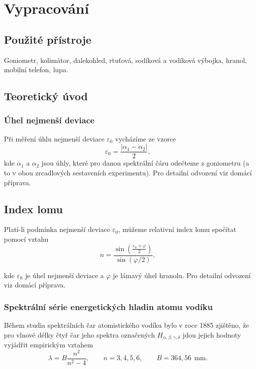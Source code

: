 \documentclass[english]{article}
\newcommand{\unit}[1]{\ \mathrm{#1}}
\begin{document}
	
\section{Vypracování}

	\subsection{Použité přístroje}
		Goniometr, kolimátor, dalekohled, rtuťová, sodíková a vodíková výbojka, hranol, mobilní telefon, lupa.
	
	\subsection{Teoretický úvod}
		
		\subsubsection{Úhel nejmenší deviace}
			Při měření úhlu nejmenší deviace $\varepsilon_0$ vycházíme ze vzorce 		
			\begin{equation}
			\varepsilon_0=\frac{|\alpha_1-\alpha_2|}{2},
			\label{eq:deviace}
			\end{equation}
			kde $\alpha_1$ a $\alpha_2$ jsou úhly, které pro danou spektrální čáru odečteme z goniometru (a to v obou zrcadlových sestaveních experimentu). Pro detailní odvození viz domácí příprava.
			
		\subsection{Index lomu}
			Platí-li podmínka nejmenší deviace $\varepsilon_0$, můžeme relativní index lomu spočítat pomocí vztahu
			\begin{equation}
			n=\frac{\sin\left(\frac{\varepsilon_0+\varphi}{2}\right)}{\sin\left(\varphi / 2\right)},
			\label{eq:index_lomu}
			\end{equation}
			
			kde $\varepsilon_0$ je úhel nejmenší deviace a $\varphi$ je lámavý úhel hranolu. Pro detailní odvození viz domácí příprava.
			
		\subsubsection{Spektrální série energetických hladin atomu vodíku}
			Během studia spektrálních čar atomistického vodíku bylo v roce 1885 zjištěno, že pro vlnové délky čtyř čar jeho spektra označených $H_{\alpha, \beta, \gamma, \delta}$ jdou jejich hodnoty vyjádřit empirickým vztahem 
			\begin{equation}
				\lambda = B\frac{n^2}{n^2-4},\qquad n=3,4,5,6, \qquad B=364,56~\unit{mm}.
			\end{equation}
			
\end{document}

